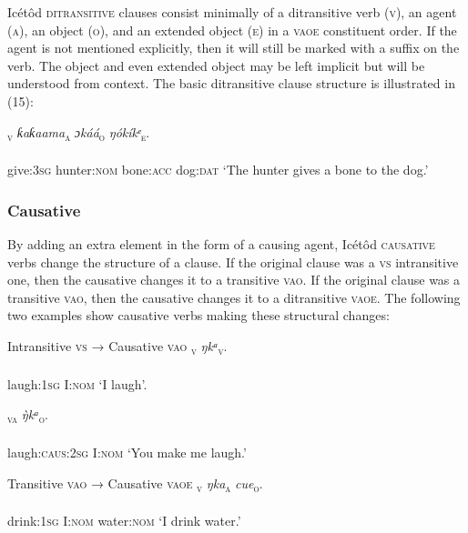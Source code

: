 Icétôd \textsc{ditransitive} clauses consist minimally of a ditransitive verb (\textsc{v}), an agent (\textsc{a}), an object (\textsc{o}), and an extended object (\textsc{e}) in a \textsc{vaoe} constituent order. If the agent is not mentioned explicitly, then it will still be marked with a suffix on the verb. The object and even extended object may be left implicit but will be understood from context. The basic ditransitive clause structure is illustrated in (15):




\ea\label{ex:}
\textsc{\textsubscript{v}}\textit{}     \textit{ƙaƙaama}\textsc{\textsubscript{a}}\textit{   ɔkáá}\textsc{\textsubscript{o}}\textit{     ŋókíkᵉ}\textsc{\textsubscript{e}}. \\
    \\
give:\textsc{3sg}   hunter:\textsc{nom}   bone:\textsc{acc}   dog:\textsc{dat}
\glt ‘The hunter gives a bone to the dog.’ 
\z




\subsubsection{Causative}

By adding an extra element in the form of a causing agent, Icétôd \textsc{causative} verbs change the structure of a clause. If the original clause was a \textsc{vs} intransitive one, then the causative changes it to a transitive \textsc{vao}. If the original clause was a transitive \textsc{vao}, then the causative changes it to a ditransitive \textsc{vaoe}. The following two examples show causative verbs making these structural changes:




Intransitive \textsc{vs} → Causative \textsc{vao}
\ea\label{ex:}
\textsc{\textsubscript{v}}     \textit{ŋkᵃ}\textsc{\textsubscript{v}}. \\
    \\
laugh:\textsc{1sg}   I:\textsc{nom}
\glt ‘I laugh’. 
\z




\ea\label{ex:}
\textsc{\textsubscript{va}}   \textit{\`{ŋ}kᵃ}\textsc{\textsubscript{o}}. \\
    \\
laugh:\textsc{caus:2sg} I:\textsc{nom}
\glt ‘You make me laugh.’ 
\z





Transitive \textsc{vao} → Causative \textsc{vaoe}
\ea\label{ex:}
\textsc{\textsubscript{ v}}     \textit{ŋka}\textsc{\textsubscript{a}}\textit{     cue}\textsc{\textsubscript{o}}. \\
    \\
drink:\textsc{1sg}   I:\textsc{nom}   water:\textsc{nom}
\glt ‘I drink water.’ 
\z




